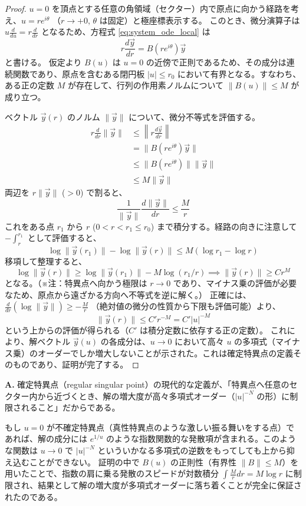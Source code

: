 \begin{proof}
    $u=0$ を頂点とする任意の角領域（セクター）内で原点に向かう経路を考え、$u = r e^{i\theta}$ （$r \to +0$, $\theta$ は固定）と極座標表示する。
    このとき、微分演算子は $u \frac{d}{du} = r \frac{d}{dr}$ となるため、方程式 \eqref{eq:system_ode_local} は
    \[
    r \frac{d\vec{y}}{dr} = B(re^{i\theta})\vec{y}
    \]
    と書ける。
    仮定より $B(u)$ は $u=0$ の近傍で正則であるため、その成分は連続関数であり、原点を含むある閉円板 $|u| \le r_0$ において有界となる。すなわち、ある正の定数 $M$ が存在して、行列の作用素ノルムについて $\|B(u)\| \le M$ が成り立つ。
    
    ベクトル $\vec{y}(r)$ のノルム $\|\vec{y}\|$ について、微分不等式を評価する。
    \begin{align*}
        r \frac{d}{dr} \|\vec{y}\| &\le \left\| r \frac{d\vec{y}}{dr} \right\| \\
        &= \| B(re^{i\theta})\vec{y} \| \\
        &\le \| B(re^{i\theta}) \| \|\vec{y}\| \\
        &\le M \|\vec{y}\|
    \end{align*}
    両辺を $r \|\vec{y}\|$ ($>0$) で割ると、
    \[
    \frac{1}{\|\vec{y}\|} \frac{d\|\vec{y}\|}{dr} \le \frac{M}{r}
    \]
    これをある点 $r_1$ から $r$ ($0 < r < r_1 \le r_0$) まで積分する。経路の向きに注意して $- \int_r^{r_1}$ として評価すると、
    \[
    \log \|\vec{y}(r_1)\| - \log \|\vec{y}(r)\| \le M (\log r_1 - \log r)
    \]
    移項して整理すると、
    \[
    \log \|\vec{y}(r)\| \ge \log \|\vec{y}(r_1)\| - M \log(r_1 / r) \implies \|\vec{y}(r)\| \ge C r^M
    \]
    となる。（※注：特異点へ向かう極限は $r \to 0$ であり、マイナス乗の評価が必要なため、原点から遠ざかる方向へ不等式を逆に解く。）
    正確には、$\frac{d}{dr}(\log \|\vec{y}\|) \ge - \frac{M}{r}$ （絶対値の微分の性質から下限も評価可能）より、
    \[
    \|\vec{y}(r)\| \le C' r^{-M} = C' |u|^{-M}
    \]
    という上からの評価が得られる（$C'$ は積分定数に依存する正の定数）。
    これにより、解ベクトル $\vec{y}(u)$ の各成分は、$u \to 0$ において高々 $u$ の多項式（マイナス乗）のオーダーでしか増大しないことが示された。これは確定特異点の定義そのものであり、証明が完了する。
\end{proof}

\begin{Q}
\textbf{A.} 確定特異点（regular singular point）の現代的な定義が、「特異点へ任意のセクター内から近づくとき、解の増大度が高々多項式オーダー（$|u|^{-N}$ の形）に制限されること」だからである。

もし $u=0$ が不確定特異点（真性特異点のような激しい振る舞いをする点）であれば、解の成分には $e^{1/u}$ のような指数関数的な発散項が含まれる。このような関数は $u \to 0$ で $|u|^{-N}$ といういかなる多項式の逆数をもってしても上から抑え込むことができない。
証明の中で $B(u)$ の正則性（有界性 $\|B\| \le M$）を用いたことで、指数の肩に乗る発散のスピードが対数積分 $\int \frac{M}{r} dr = M \log r$ に制限され、結果として解の増大度が多項式オーダーに落ち着くことが完全に保証されたのである。
\end{Q}

